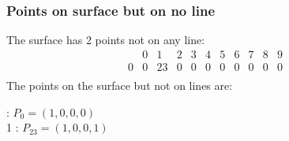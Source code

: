 \documentclass{article}
\begin{document}
{\subsubsection*{Points on surface but on no line}
The surface has 2 points not on any line:\\
$$
\begin{array}{r|*{10}{r}}
 & 0 & 1 & 2 & 3 & 4 & 5 & 6 & 7 & 8 & 9\\
\hline
0 & 0 & 23 & 0 & 0 & 0 & 0 & 0 & 0 & 0 & 0\\
\end{array}
$$
The points on the surface but not on lines are:\\
\begin{multicols}{2}
 : $P_{0}=( 1, 0, 0, 0 )$\\
1 : $P_{23}=( 1, 0, 0, 1 )$\\
\end{multicols}
}
\end{document}
